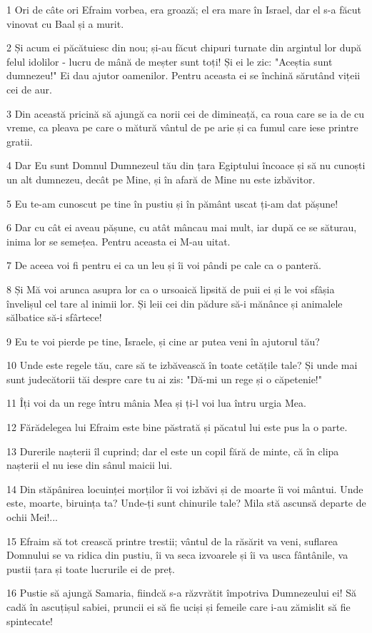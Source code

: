 \par 1 Ori de câte ori Efraim vorbea, era groază; el era mare în Israel, dar el s-a făcut vinovat cu Baal și a murit.
\par 2 Și acum ei păcătuiesc din nou; și-au făcut chipuri turnate din argintul lor după felul idolilor - lucru de mână de meșter sunt toți! Și ei le zic: "Aceștia sunt dumnezeu!" Ei dau ajutor oamenilor. Pentru aceasta ei se închină sărutând vițeii cei de aur.
\par 3 Din această pricină să ajungă ca norii cei de dimineață, ca roua care se ia de cu vreme, ca pleava pe care o mătură vântul de pe arie și ca fumul care iese printre gratii.
\par 4 Dar Eu sunt Domnul Dumnezeul tău din țara Egiptului încoace și să nu cunoști un alt dumnezeu, decât pe Mine, și în afară de Mine nu este izbăvitor.
\par 5 Eu te-am cunoscut pe tine în pustiu și în pământ uscat ți-am dat pășune!
\par 6 Dar cu cât ei aveau pășune, cu atât mâncau mai mult, iar după ce se săturau, inima lor se semețea. Pentru aceasta ei M-au uitat.
\par 7 De aceea voi fi pentru ei ca un leu și îi voi pândi pe cale ca o panteră.
\par 8 Și Mă voi arunca asupra lor ca o ursoaică lipsită de puii ei și le voi sfâșia învelișul cel tare al inimii lor. Și leii cei din pădure să-i mănânce și animalele sălbatice să-i sfârtece!
\par 9 Eu te voi pierde pe tine, Israele, și cine ar putea veni în ajutorul tău?
\par 10 Unde este regele tău, care să te izbăvească în toate cetățile tale? Și unde mai sunt judecătorii tăi despre care tu ai zis: "Dă-mi un rege și o căpetenie!"
\par 11 Îți voi da un rege întru mânia Mea și ți-l voi lua întru urgia Mea.
\par 12 Fărădelegea lui Efraim este bine păstrată și păcatul lui este pus la o parte.
\par 13 Durerile nașterii îl cuprind; dar el este un copil fără de minte, că în clipa nașterii el nu iese din sânul maicii lui.
\par 14 Din stăpânirea locuinței morților îi voi izbăvi și de moarte îi voi mântui. Unde este, moarte, biruința ta? Unde-ți sunt chinurile tale? Mila stă ascunsă departe de ochii Mei!...
\par 15 Efraim să tot crească printre trestii; vântul de la răsărit va veni, suflarea Domnului se va ridica din pustiu, îi va seca izvoarele și îi va usca fântânile, va pustii țara și toate lucrurile ei de preț.
\par 16 Pustie să ajungă Samaria, fiindcă s-a răzvrătit împotriva Dumnezeului ei! Să cadă în ascuțișul sabiei, pruncii ei să fie uciși și femeile care i-au zămislit să fie spintecate!

